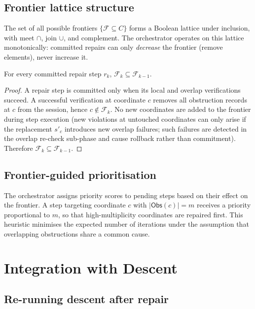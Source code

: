 \documentclass[11pt]{article}
\newcommand{\RF}{\mathcal{F}}               %
\begin{document}
\subsection{Frontier lattice structure}

The set of all possible frontiers $\{\RF \subseteq C\}$ forms a Boolean
lattice under inclusion, with meet $\cap$, join $\cup$, and complement.
The orchestrator operates on this lattice monotonically: committed repairs
can only \emph{decrease} the frontier (remove elements), never increase it.

\begin{proposition}
\label{prop:monotone}
For every committed repair step $r_k$, $\RF_{k} \subseteq \RF_{k-1}$.
\end{proposition}
\begin{proof}
A repair step is committed only when its local and overlap verifications
succeed.  A successful verification at coordinate $c$ removes all obstruction
records at $c$ from the session, hence $c \notin \RF_k$.  No new coordinates
are added to the frontier during step execution (new violations at untouched
coordinates can only arise if the replacement $s'_c$ introduces new overlap
failures; such failures are detected in the overlap re-check sub-phase and
cause rollback rather than commitment).  Therefore $\RF_k \subseteq \RF_{k-1}$.
\end{proof}

\subsection{Frontier-guided prioritisation}

The orchestrator assigns priority scores to pending steps based on their
effect on the frontier.  A step targeting coordinate $c$ with
$|\mathsf{Obs}(c)| = m$ receives a priority proportional to $m$, so that
high-multiplicity coordinates are repaired first.  This heuristic minimises
the expected number of iterations under the assumption that overlapping
obstructions share a common cause.

\section{Integration with Descent}
\label{sec:descent}

\subsection{Re-running descent after repair}
\end{document}
